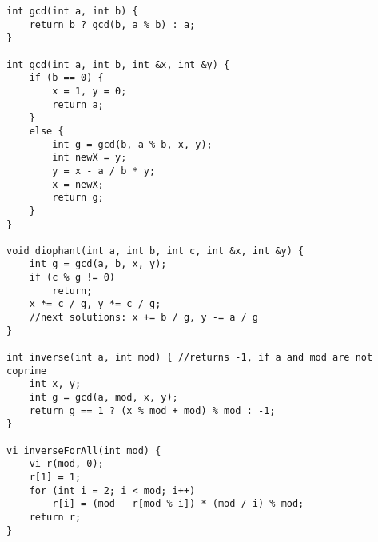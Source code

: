 \begin{verbatim}
int gcd(int a, int b) {
	return b ? gcd(b, a % b) : a;
}
	
int gcd(int a, int b, int &x, int &y) {
 	if (b == 0) {
 		x = 1, y = 0; 
 		return a;
 	} 
 	else {
 		int g = gcd(b, a % b, x, y);
		int newX = y;
		y = x - a / b * y;
		x = newX;
		return g;
	}
}

void diophant(int a, int b, int c, int &x, int &y) {
	int g = gcd(a, b, x, y);
	if (c % g != 0)
		return;
	x *= c / g, y *= c / g;
	//next solutions: x += b / g, y -= a / g
}

int inverse(int a, int mod) { //returns -1, if a and mod are not coprime
	int x, y;
	int g = gcd(a, mod, x, y);
	return g == 1 ? (x % mod + mod) % mod : -1;
}

vi inverseForAll(int mod) {
	vi r(mod, 0);
	r[1] = 1;
	for (int i = 2; i < mod; i++)
		r[i] = (mod - r[mod % i]) * (mod / i) % mod;
	return r;
}
\end{verbatim}
